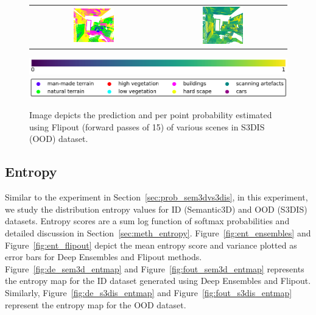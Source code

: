 \begin{figure}[h!]
\begin{tabular}{cc}
            \includegraphics[width=0.33\textwidth, height=0.18\textheight]{images/seg_output/s3dis_DE/office_42.pdf}& 
            \includegraphics[width=0.33\textwidth, height=0.18\textheight]{images/seg_output/s3dis_DE/fout_4.png}\\
        \end{tabular}
        \includegraphics[scale=0.45]{images/prob_legend.pdf}
        \includegraphics[scale=0.45]{images/legend.png}
        \caption{Image depicts the prediction and per point probability estimated using Flipout (forward passes of 15) of various scenes in S3DIS (OOD) dataset.}
        \label{fig:fout_s3dis_probmap}
    \end{figure}


    \FloatBarrier
    \subsection{Entropy}
    \label{sec:ent_sem3dvs3dis}

    Similar to the experiment in Section~\ref{sec:prob_sem3dvs3dis}, in this experiment, we study the distribution entropy values for ID (Semantic3D) and OOD (S3DIS) datasets.
    Entropy scores are a sum log function of softmax probabilities and detailed discussion in Section~\ref{sec:meth_entropy}.
    Figure~\ref{fig:ent_ensembles} and Figure~\ref{fig:ent_flipout} depict the mean entropy score and variance plotted as error bars for Deep Ensembles and Flipout methods.    
    Figure~\ref{fig:de_sem3d_entmap} and Figure~\ref{fig:fout_sem3d_entmap} represents the entropy map for the ID dataset generated using Deep Ensembles and Flipout.
    Similarly, Figure~\ref{fig:de_s3dis_entmap} and Figure~\ref{fig:fout_s3dis_entmap} represent the entropy map for the OOD dataset.

